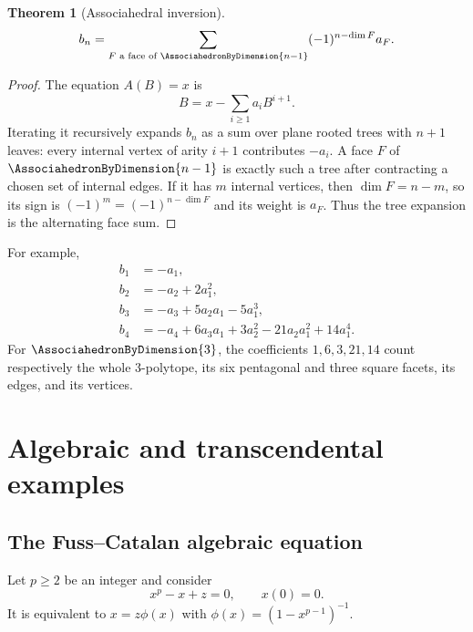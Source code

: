 \documentclass[11pt,a4paper,oneside,openany]{book}
\newtheorem{theorem}{Theorem}[chapter]
\theoremstyle{definition}
\theoremstyle{remark}
\begin{document}
\begin{theorem}[Associahedral inversion]\label{thm:associahedral-inversion}
\begin{equation}\label{eq:associahedral-inversion}
 b_n=\sum_{F\text{ a face of }\AssociahedronByDimension{n-1}}(-1)^{n-\dim F}a_F.
\end{equation}
\end{theorem}
\begin{proof}
The equation $A(B)=x$ is
\[
 B=x-\sum_{i\ge1}a_iB^{i+1}.
\]
Iterating it recursively expands $b_n$ as a sum over plane rooted trees with
$n+1$ leaves: every internal vertex of arity $i+1$ contributes $-a_i$.
A face $F$ of $\AssociahedronByDimension{n-1}$ is exactly such a tree after contracting a chosen set of
internal edges.  If it has $m$ internal vertices, then
$\dim F=n-m$, so its sign is $(-1)^m=(-1)^{n-\dim F}$ and its weight is $a_F$.
Thus the tree expansion is the alternating face sum.
\end{proof}

For example,
\begin{align*}
 b_1&=-a_1,\\
 b_2&=-a_2+2a_1^2,\\
 b_3&=-a_3+5a_2a_1-5a_1^3,\\
 b_4&=-a_4+6a_3a_1+3a_2^2-21a_2a_1^2+14a_1^4.
\end{align*}
For $\AssociahedronByDimension{3}$, the coefficients $1,6,3,21,14$ count respectively the whole
3-polytope, its six pentagonal and three square facets, its edges, and its
vertices.

\chapter{Algebraic and transcendental examples}

\section{The Fuss--Catalan algebraic equation}
Let $p\ge2$ be an integer and consider
\begin{equation}\label{eq:fuss-equation}
 x^p-x+z=0,
 \qquad x(0)=0.
\end{equation}
It is equivalent to
$x=z\phi(x)$ with $\phi(x)=(1-x^{p-1})^{-1}$.
\end{document}
